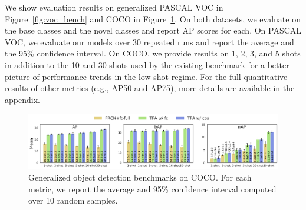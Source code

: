 \vspace{3mm}
We show evaluation results on generalized PASCAL VOC in Figure~\ref{fig:voc_bench} and COCO in Figure~\ref{fig:coco_bench}.
On both datasets, we evaluate on the base classes and the novel classes and report AP scores for each.
On PASCAL VOC, we evaluate our models over 30 repeated runs and report the average and the 95\% confidence interval.
On COCO, we provide results on 1, 2, 3, and 5 shots in addition to the 10 and 30 shots used by the existing benchmark for a better picture of performance trends in the low-shot regime. For the full quantitative results of other metrics (e.g., AP50 and AP75), more details are available in the appendix.


\begin{figure}[ht]
	\begin{center}
		\centerline{\includegraphics[width=.9\linewidth]{figs/coco_benchmark_full.pdf}}
		\vspace{-5mm}
		\caption{Generalized object detection benchmarks on COCO. For each metric, we report the average and 95\% confidence interval computed over 10 random samples.}
		\label{fig:coco_bench}
	\end{center}
\end{figure}

